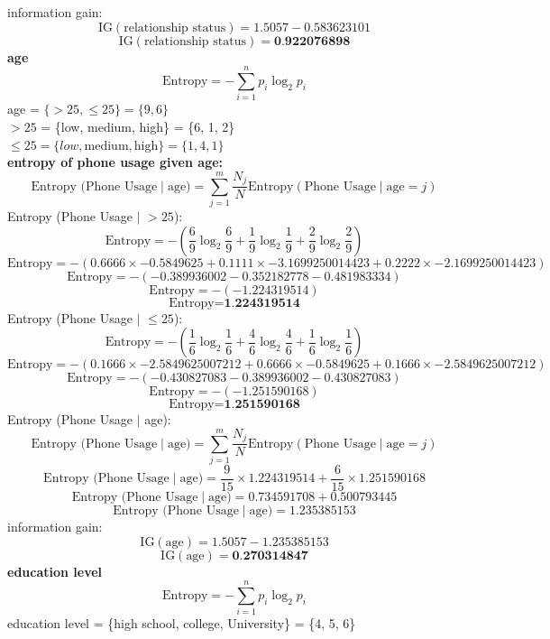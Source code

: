 \documentclass[a3paper,12pt]{extarticle} %
\begin{document}
\begin{enumerate}
\[    \]
    information gain:
    \[
    \text{IG}(\text{relationship status}) = 1.5057 - 0.583623101
    \]
    \[
    \text{IG}(\text{relationship status}) = \textbf{0.922076898}
    \]
    \textbf{age}
    \[
    \text{Entropy} = -\sum_{i=1}^n p_i \log_2 p_i
    \]
    age = $\{>25, \leq 25\} = \{9, 6\}$
    \\ $>25$ = \{low, medium, high\} = \{6, 1, 2\}
    \\ $ \leq 25 = \{low, \text{medium}, \text{high}\} = \{1, 4, 1\} $
    \\ \textbf{entropy of phone usage given age:}
    \[
    \text{Entropy (Phone Usage} \mid \text{age)} = \sum_{j=1}^m \frac{N_j}{N} \text{Entropy}(\text{Phone Usage} \mid \text{age} = j)
    \]
    Entropy (Phone Usage $\mid$ $>25$):
    \[
    \text{Entropy} = -\left(\frac{6}{9} \log_2 \frac{6}{9} + \frac{1}{9} \log_2 \frac{1}{9} + \frac{2}{9} \log_2 \frac{2}{9}\right)
    \]
    \[
    \text{Entropy} = -\left(0.6666 \times -0.5849625 + 0.1111 \times -3.1699250014423 + 0.2222 \times -2.1699250014423\right)
    \]
    \[
    \text{Entropy} = -\left(-0.389936002 - 0.352182778 - 0.481983334\right)
    \]
    \[
    \text{Entropy} = -\left(- 1.224319514\right)
    \]
    \[
    \text{Entropy} = \textbf{1.224319514}
    \]
    Entropy (Phone Usage $\mid$ $\leq 25$):
    \[
    \text{Entropy} = -\left(\frac{1}{6} \log_2 \frac{1}{6} + \frac{4}{6} \log_2 \frac{4}{6} + \frac{1}{6} \log_2 \frac{1}{6}\right)
    \]
    \[
    \text{Entropy} = -\left(0.1666 \times -2.5849625007212 + 0.6666 \times -0.5849625 + 0.1666 \times -2.5849625007212\right)
    \]
    \[
    \text{Entropy} = -\left(-0.430827083 - 0.389936002 - 0.430827083\right)
    \]
    \[
    \text{Entropy} = -\left(- 1.251590168\right)
    \]
    \[
    \text{Entropy} = \textbf{1.251590168}
    \]
    Entropy (Phone Usage $\mid$ age):
    \[
    \text{Entropy (Phone Usage} \mid \text{age)} = \sum_{j=1}^m \frac{N_j}{N} \text{Entropy}(\text{Phone Usage} \mid \text{age} = j)
    \]
    \[
    \text{Entropy (Phone Usage} \mid \text{age)} = \frac{9}{15} \times 1.224319514 + \frac{6}{15} \times 1.251590168
    \]
    \[
    \text{Entropy (Phone Usage} \mid \text{age)} = 0.734591708 + 0.500793445
    \]
    \[
    \text{Entropy (Phone Usage} \mid \text{age)} = 1.235385153
    \]
    information gain:
    \[
    \text{IG}(\text{age}) = 1.5057 - 1.235385153
    \]
    \[
    \text{IG}(\text{age}) = \textbf{0.270314847}
    \]
    \textbf{education level}
    \[
    \text{Entropy} = -\sum_{i=1}^n p_i \log_2 p_i
    \]
    education level = \{high school, college, University\} = \{4, 5, 6\}

\end{enumerate}
\end{document}
